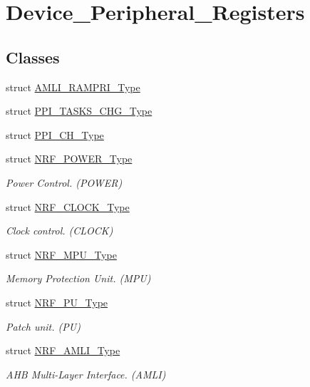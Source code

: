 \hypertarget{group___device___peripheral___registers}{}\section{Device\+\_\+\+Peripheral\+\_\+\+Registers}
\label{group___device___peripheral___registers}
\subsection*{Classes}
\begin{DoxyCompactItemize}
\item 
struct \hyperlink{struct_a_m_l_i___r_a_m_p_r_i___type}{A\+M\+L\+I\+\_\+\+R\+A\+M\+P\+R\+I\+\_\+\+Type}
\item 
struct \hyperlink{struct_p_p_i___t_a_s_k_s___c_h_g___type}{P\+P\+I\+\_\+\+T\+A\+S\+K\+S\+\_\+\+C\+H\+G\+\_\+\+Type}
\item 
struct \hyperlink{struct_p_p_i___c_h___type}{P\+P\+I\+\_\+\+C\+H\+\_\+\+Type}
\item 
struct \hyperlink{struct_n_r_f___p_o_w_e_r___type}{N\+R\+F\+\_\+\+P\+O\+W\+E\+R\+\_\+\+Type}
\begin{DoxyCompactList}\small\item\em Power Control. (P\+O\+W\+E\+R) \end{DoxyCompactList}\item 
struct \hyperlink{struct_n_r_f___c_l_o_c_k___type}{N\+R\+F\+\_\+\+C\+L\+O\+C\+K\+\_\+\+Type}
\begin{DoxyCompactList}\small\item\em Clock control. (C\+L\+O\+C\+K) \end{DoxyCompactList}\item 
struct \hyperlink{struct_n_r_f___m_p_u___type}{N\+R\+F\+\_\+\+M\+P\+U\+\_\+\+Type}
\begin{DoxyCompactList}\small\item\em Memory Protection Unit. (M\+P\+U) \end{DoxyCompactList}\item 
struct \hyperlink{struct_n_r_f___p_u___type}{N\+R\+F\+\_\+\+P\+U\+\_\+\+Type}
\begin{DoxyCompactList}\small\item\em Patch unit. (P\+U) \end{DoxyCompactList}\item 
struct \hyperlink{struct_n_r_f___a_m_l_i___type}{N\+R\+F\+\_\+\+A\+M\+L\+I\+\_\+\+Type}
\begin{DoxyCompactList}\small\item\em A\+H\+B Multi-\/\+Layer Interface. (A\+M\+L\+I) \end{DoxyCompactList}\item 

\end{DoxyCompactItemize}
